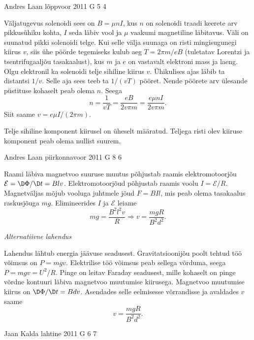 \documentclass[11pt, twoside]{article}
\begin{document}
{%
{Andres Laan} %
{lõppvoor} %
{2011} %
{G 5} %
{4} %
{

\ifSolution
Väljatugevus solenoidi sees on $B=\mu nI$, kus $n$ on solenoidi traadi keerete arv pikkusühiku kohta, $I$ seda läbiv vool ja $\mu$ vaakumi magnetiline läbitavus. Väli on suunatud pikki solenoidi telge. Kui selle välja suunaga on risti mingisugunegi kiirus $v$, siis ühe pöörde tegemiseks kulub aeg $T=2\pi m/eB$ (tuletatav Lorentzi ja tsentrifugaaljõu tasakaalust), kus $m$ ja $e$ on vastavalt elektroni mass ja laeng. Olgu elektronil ka solenoidi telje sihiline kiirus $v$. Ühikulises ajas läbib ta distantsi $1/v$. Selle aja sees teeb ta $1/(vT)$ pööret. Nende pöörete arv ülesande püstituse kohaselt peab olema $n$. Seega
\[
n=\frac{1}{vT}=\frac{eB}{2v\pi m}=\frac{e\mu nI}{2v\pi m}.
\]
Siit saame $v=e\mu I/(2\pi m)$.

Telje sihiline komponent kiirusel on üheselt määratud. Teljega risti olev kiiruse komponent peab olema nullist suurem.
\fi
}

{Andres Laan} %
{piirkonnavoor} %
{2011} %
{G 8} %
{6} %
{

\ifSolution
Raami läbiva magnetvoo suuruse muutus põhjustab raamis elektromotoorjõu $\mathcal{E} = \D\Phi/\D t = Blv$. Elektromotoorjõud põhjustab raamis voolu $I = \mathcal{E}/R$. Magnetväljas mõjub vooluga juhtmele jõud $F = BIl$, mis peab olema tasakaalus raskusjõuga $mg$. Elimineerides $I$ ja $\mathcal{E}$ leiame
\[
m g=\frac{B^{2} l^{2} v}{R} \Rightarrow v=\frac{m g R}{B^{2} d^{2}}.
\]

\medskip

\emph{Alternatiivne lahendus}

Lahendus lähtub energia jäävuse seadusest. Gravitatsioonijõu poolt tehtud töö võimsus on $P = mgv$. Elektrilise töö võimsus peab sellega võrduma, seega $P = mgv = U^2/R$. Pinge on leitav Faraday seadusest, mille kohaselt on pinge võrdne kontuuri läbiva magnetvoo muutumise kiirusega. Magnetvoo muutumise kiirus on $\D\Phi/\D t = Bd v$. Asendades selle eelmisesse võrrandisse ja avaldades $v$ saame 
\[
v=\frac{m g R}{B^{2} d^{2}}.
\] 
\fi
}

{Jaan Kalda} %
{lahtine} %
{2011} %
{G 6} %
{7} %
{

}}
\end{document}
